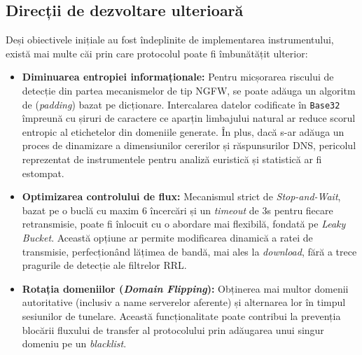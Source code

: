 \subsection{Direcții de dezvoltare ulterioară}
Deși obiectivele inițiale au fost îndeplinite de implementarea instrumentului, există mai multe căi prin care protocolul poate fi îmbunătățit ulterior:
\begin{itemize}
    \item \textbf{Diminuarea entropiei informaționale:} Pentru micșorarea riscului de detecție din partea mecanismelor de tip NGFW, se poate adăuga un algoritm de (\textit{padding}) bazat pe dicționare. Intercalarea datelor codificate în \texttt{Base32} împreună cu șiruri de caractere ce aparțin limbajului natural ar reduce scorul entropic al etichetelor din domeniile generate. În plus, dacă s-ar adăuga un proces de dinamizare a dimensiunilor cererilor și răspunsurilor DNS, pericolul reprezentat de instrumentele pentru analiză euristică și statistică ar fi estompat.
    \item \textbf{Optimizarea controlului de flux:} Mecanismul strict de \textit{Stop-and-Wait}, bazat pe o buclă cu maxim 6 încercări și un \textit{timeout} de 3s pentru fiecare retransmisie, poate fi înlocuit cu o abordare mai flexibilă, fondată pe \textit{Leaky Bucket}. Această opțiune ar permite modificarea dinamică a ratei de transmisie, perfecționând lățimea de bandă, mai ales la \textit{download}, fără a trece pragurile de detecție ale filtrelor RRL.
    \item \textbf{Rotația domeniilor (\textit{Domain Flipping}):} Obținerea mai multor domenii autoritative (inclusiv a name serverelor aferente) și alternarea lor în timpul sesiunilor de tunelare. Această funcționalitate poate contribui la prevenția blocării fluxului de transfer al protocolului prin adăugarea unui singur domeniu pe un \textit{blacklist}.
\end{itemize}